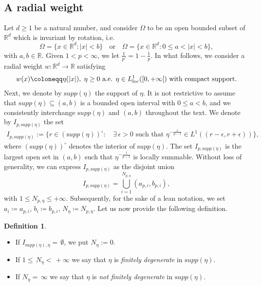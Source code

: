 \documentclass[11pt,leqno]{amsart}
\theoremstyle{remark}
\theoremstyle{definition}
\newtheorem{defi}[teo]{Definition}%
\theoremstyle{definition}
\newcommand{\bbR}{{\mathbb{R}}}
\newcommand{\R}{\bbR}
\begin{document}
\subsection{A radial weight}
Let $d\geq 1$ be a natural number, and consider $\Omega$ to be an open bounded subset of $\bbR^{d}$ which is invariant by rotation, i.e.
$$
\Omega=\{x\in \R^d: |x|< b
\}\,\ \ \text{ or }\ \ \ 
\Omega=\{x\in \R^d: 0\leq a< |x|< b
\},
$$
with $a,b\in \R$.
Given $1<p<\infty$, we let $\frac{1}{p'}= 1-\frac{1}{p}$. In what follows, we consider a radial weight $w:\R^{d} \to \R$ satisfying
\begin{equation}\label{minassweight}
w(x)\coloneqq \eta(\vert x\vert), \hskip 0,1cm \eta\geq 0 \text{ a.e. $\eta \in L^1_{\rm{loc}}([0,+\infty[)$ with compact support.}
\end{equation}
Next, we denote by ${\mathrm supp}(\eta)$ the support of $\eta$. It is not restrictive to assume that ${\mathrm supp}(\eta)\subseteq(a,b)$ is a bounded open interval with $0\leq a<b$, and we consistently interchange ${\mathrm supp}(\eta)$ and $(a,b)$ throughout the text. We denote by $I_{p,{\mathrm supp}(\eta)}$ the set
\begin{align}
\label{decomposet}
I_{p,{\mathrm supp}(\eta)}:=\Big\{r\in({\mathrm supp}(\eta))^{\circ}:\,&\exists\,\epsilon >0\text{ such that }
\eta^{-\frac{1}{p-1}}\in L^1\left((r-\epsilon ,r+\epsilon )\right)\Big\},
\end{align}
where $({\mathrm supp}(\eta))^{\circ}$ denotes the interior of ${\mathrm supp}(\eta)$. The set $I_{p,{\mathrm supp}(\eta)}$ is the largest open set in $(a,b)$ such that $\eta^{-\frac{1}{p-1}}$ is locally summable. Without loss of generality, we can express $I_{p,{\mathrm supp}(\eta)}$ as the disjoint union
\begin{equation}\label{minassweight3}
I_{p,{\mathrm supp}(\eta)} = \bigcup_{i=1}^{{N_{p,\eta}}} (a_{p,i}, b_{p,i}),
\end{equation}
with $1\leq N_{p,\eta}\leq +\infty$. Subsequently, for the sake of a lean notation, we set $a_{i} \coloneqq a_{p,i}$, $b_{i} \coloneqq b_{p,i}$, $N_{\eta} \coloneqq N_{p,\eta}$. Let us now provide the following definition.
\begin{defi}\label{deff1}
\begin{itemize}
\item[(i)] If $I_{{\mathrm supp}(\eta),\eta}=\,\emptyset$, we put $N_\eta:=0$.
\item[(ii)]  If $1\le\,N_{\eta}<\,+\infty$  we say that $\eta$ is {\it finitely degenerate} in ${\mathrm supp}(\eta)$. 
\item[(iii)]   If $N_\eta=\,\infty$  we say that $\eta$ is {\it not finitely degenerate} in ${\mathrm supp}(\eta)$.
\end{itemize}
\end{defi}
\end{document}
